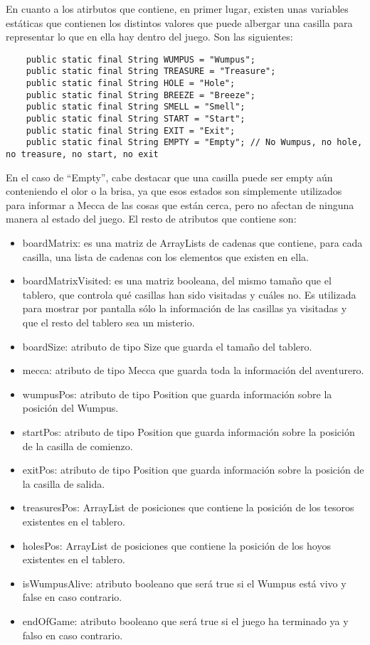 \documentclass[a4paper,12pt,twoside,openright]{report}
\begin{document}
   En cuanto a los atirbutos que contiene, en primer lugar, existen unas variables estáticas que contienen los distintos 
   valores que puede albergar una casilla para representar lo que en ella hay dentro del juego. Son las siguientes:
   \begin{lstlisting}
    public static final String WUMPUS = "Wumpus";
	public static final String TREASURE = "Treasure";
	public static final String HOLE = "Hole";
	public static final String BREEZE = "Breeze";
	public static final String SMELL = "Smell";
	public static final String START = "Start";
	public static final String EXIT = "Exit";
	public static final String EMPTY = "Empty"; // No Wumpus, no hole, no treasure, no start, no exit
   \end{lstlisting}
  En el caso de ``Empty'', cabe destacar que una casilla puede ser empty aún conteniendo el olor o la brisa, ya que 
  esos estados son simplemente utilizados para informar a Mecca de las cosas que están cerca, pero no afectan de ninguna 
  manera al estado del juego.
  El resto de atributos que contiene son:
  \begin{itemize}
   \item boardMatrix: es una matriz de ArrayLists de cadenas que contiene, para cada casilla, una lista de cadenas con los 
   elementos que existen en ella.
   \item boardMatrixVisited: es una matriz booleana, del mismo tamaño que el tablero, que controla qué casillas han 
   sido visitadas y cuáles no. Es utilizada para mostrar por pantalla sólo la información de las casillas ya visitadas 
   y que el resto del tablero sea un misterio.
   \item boardSize: atributo de tipo Size que guarda el tamaño del tablero.
   \item mecca: atributo de tipo Mecca que guarda toda la información del aventurero.
   \item wumpusPos: atributo de tipo Position que guarda información sobre la posición del Wumpus.
   \item startPos: atributo de tipo Position que guarda información sobre la posición de la casilla de comienzo.
   \item exitPos: atributo de tipo Position que guarda información sobre la posición de la casilla de salida.
   \item treasuresPos: ArrayList de posiciones que contiene la posición de los tesoros existentes en el tablero.
   \item holesPos: ArrayList de posiciones que contiene la posición de los hoyos existentes en el tablero.
   \item isWumpusAlive: atributo booleano que será true si el Wumpus está vivo y false en caso contrario.
   \item endOfGame: atributo booleano que será true si el juego ha terminado ya y falso en caso contrario.
  \end{itemize}
  
\end{document}
